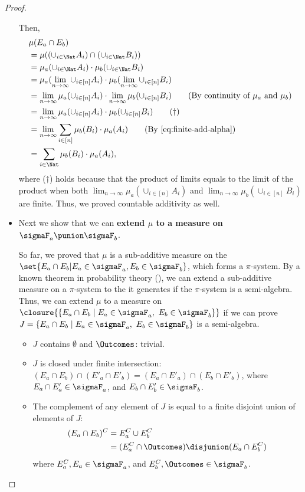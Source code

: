 \begin{proof}
\begin{itemize}
Then,
  \begin{align}
   &\mu(E_a \cap E_b) \notag \\
   &= \mu((\cup_{i \in \Nat} A_i) \cap (\cup_{i \in \Nat} B_i)) \notag \\
   &= \mu_a(\cup_{i \in \Nat} A_i) \cdot \mu_b(\cup_{i \in \Nat} B_i) \notag \\
   &= \mu_a(\lim_{n \to \infty} \cup_{i \in [n]} A_i) \cdot \mu_b(\lim_{n \to \infty} \cup_{i \in [n]} B_i) \notag \\
   &= \lim_{n \to \infty} \mu_a(\cup_{i \in [n]} A_i) \cdot \lim_{n \to \infty} \mu_b( \cup_{i \in [n]} B_i) \tag{By continuity of $\mu_a$ and $\mu_b$} \\
   &= \lim_{n \to \infty} \mu_a(\cup_{i \in [n]} A_i) \cdot \mu_b( \cup_{i \in [n]} B_i) \tag{$\dagger$} \\
   &= \lim_{n \to \infty} \sum_{i \in [n]}  \mu_b ( B_i) \cdot \mu_a(A_i) \tag{By~\cref{eq:finite-add-alpha}} \\
   &= \sum_{i \in \Nat}  \mu_b ( B_i) \cdot \mu_a(A_i),
  \end{align}
where ($\dagger$) holds because that the product of limits equals to the limit of
  the product when both $\lim_{n \to \infty} \mu_a(\cup_{i \in [n]} A_i)$ and
  $\lim_{n \to \infty} \mu_b( \cup_{i \in [n]} B_i)$ are finite.
  Thus, we proved countable additivity as well.



 \item
  Next we show that we can \textbf{extend $\mu$ to a measure on
  $\sigmaF_a \punion \sigmaF_b$}.

  So far, we proved that $\mu$ is a sub-additive measure on the
  $\set{E_a \cap E_b | E_a \in \sigmaF_a, E_b \in \sigmaF_b}$,
  which forms a $\pi$-system.
  By a known theorem in probability theory
  (\eg \cite[Corollary 2.5.4]{rosenthal2006first}),
  we can extend a sub-additive measure on a
   $\pi$-system to the \salgebra{} it generates if the $\pi$-system is
   a semi-algebra.
   Thus, we can extend $\mu$ to a measure on $\closure{\{E_a \cap E_b \mid E_a \in \sigmaF_a,\ E_b \in \sigmaF_b\}}$ if we can prove $J = \{E_a \cap E_b \mid E_a \in \sigmaF_a,\ E_b \in \sigmaF_b\}$ is a semi-algebra.

   \begin{itemize}
    \item $J$ contains $\emptyset$ and $\Outcomes$: trivial.
    \item $J$ is closed under finite intersection:
     $(E_a \cap E_b) \cap (E'_a \cap E'_b) = (E_a \cap E'_a) \cap (E_b \cap E'_b)$, where $E_a \cap E'_a \in \sigmaF_a$, and $E_b \cap E'_b \in \sigmaF_b$.
    \item The complement of any element of $J$ is equal to a finite disjoint
     union of elements of $J$:
     \begin{align*}
      (E_a \cap E_b)^C &= E_a^C \cup E_b^C \\
             &= (E_a^C \cap \Outcomes) \disjunion (E_a \cap E_b^C)
     \end{align*}
     where $E_a^C, E_a \in \sigmaF_a$, and $E_b^C, \Outcomes \in \sigmaF_b$.


\end{itemize}
\end{itemize}
\end{proof}
